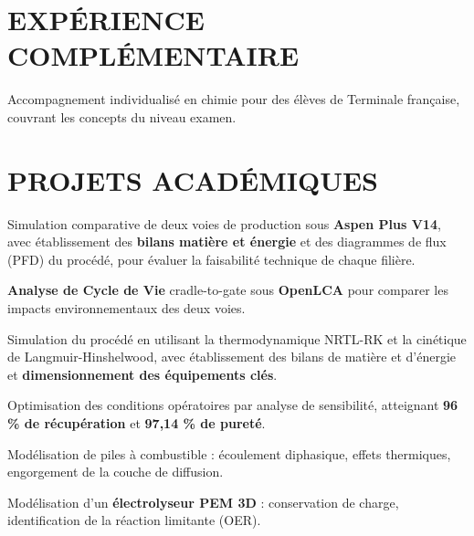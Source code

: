 \documentclass[10pt]{article}
\begin{document}
\section{EXPÉRIENCE COMPLÉMENTAIRE}
\begin{bul}
\item Accompagnement individualisé en chimie pour des élèves de Terminale française, couvrant les concepts du niveau examen.
\end{bul}

\section{PROJETS ACADÉMIQUES}
\begin{bul}
\item Simulation comparative de deux voies de production sous \textbf{Aspen Plus V14}, avec établissement des \textbf{bilans matière et énergie} et des diagrammes de flux (PFD) du procédé, pour évaluer la faisabilité technique de chaque filière.
\item \textbf{Analyse de Cycle de Vie} cradle-to-gate sous \textbf{OpenLCA} pour comparer les impacts environnementaux des deux voies.
\end{bul}
\begin{bul}
\item Simulation du procédé en utilisant la thermodynamique NRTL-RK et la cinétique de Langmuir-Hinshelwood, avec établissement des bilans de matière et d'énergie et \textbf{dimensionnement des équipements clés}.
\item Optimisation des conditions opératoires par analyse de sensibilité, atteignant \textbf{96 \% de récupération} et \textbf{97,14 \% de pureté}.
\end{bul}
\begin{bul}
\item Modélisation de piles à combustible : écoulement diphasique, effets thermiques, engorgement de la couche de diffusion.
\item Modélisation d'un \textbf{électrolyseur PEM 3D} : conservation de charge, identification de la réaction limitante (OER).
\end{bul}
\end{document}
